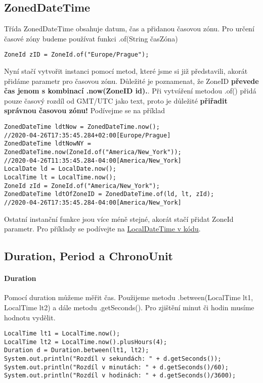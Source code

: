 \documentclass[11pt,a4paper,titlepage]{article}
\begin{document}
\subsection{ZonedDateTime}
Třída ZonedDateTime obsahuje datum, čas a přidanou časovou zónu. Pro určení časové zóny budeme používat funkci .of(String časZóna) \parencite{java8_zoneid}
\begin{verbatim}
ZoneId zID = ZoneId.of("Europe/Prague");
\end{verbatim}
Nyní stačí vytvořit instanci pomocí metod, které jsme si již představili, akorát přidáme parametr pro časovou zónu. Důležité je poznamenat, že ZoneID \textbf{převede čas jenom s kombinací .now(ZoneID id).}. Při vytváření metodou .of() přidá pouze časový rozdíl od GMT/UTC jako text, proto je důležité \textbf{přiřadit správnou časovou zónu!} Podívejme se na příklad
\begin{verbatim}
ZonedDateTime ldtNow = ZonedDateTime.now();
//2020-04-26T17:35:45.284+02:00[Europe/Prague]
ZonedDateTime ldtNowNY = ZonedDateTime.now(ZoneId.of("America/New_York"));
//2020-04-26T11:35:45.284-04:00[America/New_York]
LocalDate ld = LocalDate.now();
LocalTime lt = LocalTime.now();
ZoneId zId = ZoneId.of("America/New_York");
ZonedDateTime ldtOfZoneID = ZonedDateTime.of(ld, lt, zId);
//2020-04-26T17:35:45.284-04:00[America/New_York]
\end{verbatim}
Ostatní instanční funkce jsou více méně stejné, akorát stačí přidat ZoneId parametr. Pro příklady se podívejte na \underline{\hyperref[sec:ldt]{LocalDateTime v kódu}}.\parencite{java8_zoneddatetime}\linebreak
\subsection{Duration, Period a ChronoUnit}
\paragraph{Duration}
Pomocí duration můžeme měřit čas. Použijeme metodu .between(LocalTime lt1, LocalTime lt2) a dále metodu .getSeconds(). Pro zjištění minut či hodin musíme hodnotu vydělit. \parencite{java8_duration}
\begin{verbatim}
LocalTime lt1 = LocalTime.now();
LocalTime lt2 = LocalTime.now().plusHours(4);
Duration d = Duration.between(lt1, lt2);
System.out.println("Rozdíl v sekundách: " + d.getSeconds());
System.out.println("Rozdíl v minutách: " + d.getSeconds()/60);
System.out.println("Rozdíl v hodinách: " + d.getSeconds()/3600);
\end{verbatim}
\end{document}
